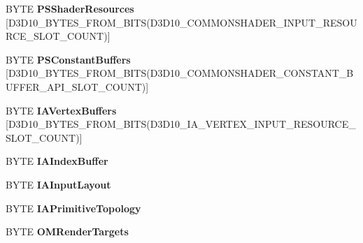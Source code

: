 \begin{DoxyCompactItemize}
B\+Y\+TE {\bfseries P\+S\+Shader\+Resources} \mbox{[}D3\+D10\+\_\+\+B\+Y\+T\+E\+S\+\_\+\+F\+R\+O\+M\+\_\+\+B\+I\+TS(D3\+D10\+\_\+\+C\+O\+M\+M\+O\+N\+S\+H\+A\+D\+E\+R\+\_\+\+I\+N\+P\+U\+T\+\_\+\+R\+E\+S\+O\+U\+R\+C\+E\+\_\+\+S\+L\+O\+T\+\_\+\+C\+O\+U\+NT)\mbox{]}
\item 
\mbox{\label{struct___d3_d10___s_t_a_t_e___b_l_o_c_k___m_a_s_k_ae8717c4dc2ad0d207e7c616085d53c50}} 
B\+Y\+TE {\bfseries P\+S\+Constant\+Buffers} \mbox{[}D3\+D10\+\_\+\+B\+Y\+T\+E\+S\+\_\+\+F\+R\+O\+M\+\_\+\+B\+I\+TS(D3\+D10\+\_\+\+C\+O\+M\+M\+O\+N\+S\+H\+A\+D\+E\+R\+\_\+\+C\+O\+N\+S\+T\+A\+N\+T\+\_\+\+B\+U\+F\+F\+E\+R\+\_\+\+A\+P\+I\+\_\+\+S\+L\+O\+T\+\_\+\+C\+O\+U\+NT)\mbox{]}
\item 
\mbox{\label{struct___d3_d10___s_t_a_t_e___b_l_o_c_k___m_a_s_k_aaf20642a7cf53e337eff285eea60d6cf}} 
B\+Y\+TE {\bfseries I\+A\+Vertex\+Buffers} \mbox{[}D3\+D10\+\_\+\+B\+Y\+T\+E\+S\+\_\+\+F\+R\+O\+M\+\_\+\+B\+I\+TS(D3\+D10\+\_\+\+I\+A\+\_\+\+V\+E\+R\+T\+E\+X\+\_\+\+I\+N\+P\+U\+T\+\_\+\+R\+E\+S\+O\+U\+R\+C\+E\+\_\+\+S\+L\+O\+T\+\_\+\+C\+O\+U\+NT)\mbox{]}
\item 
\mbox{\label{struct___d3_d10___s_t_a_t_e___b_l_o_c_k___m_a_s_k_a1db0c5b90adb62b5e8916b873e713c09}} 
B\+Y\+TE {\bfseries I\+A\+Index\+Buffer}
\item 
\mbox{\label{struct___d3_d10___s_t_a_t_e___b_l_o_c_k___m_a_s_k_ac0ae1bfad27f9932c888810e8eccc0fb}} 
B\+Y\+TE {\bfseries I\+A\+Input\+Layout}
\item 
\mbox{\label{struct___d3_d10___s_t_a_t_e___b_l_o_c_k___m_a_s_k_af99ab0b356edd748fe62590d3666b611}} 
B\+Y\+TE {\bfseries I\+A\+Primitive\+Topology}
\item 
\mbox{\label{struct___d3_d10___s_t_a_t_e___b_l_o_c_k___m_a_s_k_aa211127fc070ea46d94235a9019f16d6}} 
B\+Y\+TE {\bfseries O\+M\+Render\+Targets}
\item 
\mbox{\label{struct___d3_d10___s_t_a_t_e___b_l_o_c_k___m_a_s_k_a6c8bcaf165e0d29796c7c66956c5efab}} 

\end{DoxyCompactItemize}
